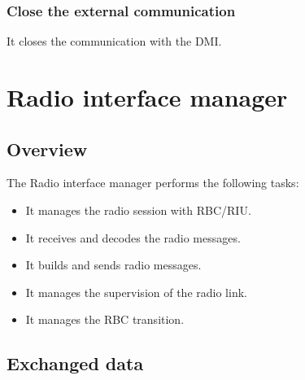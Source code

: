 \documentclass[nocc]{template/openetcs_report}
\begin{document}
\subsection{Close the external communication}
It closes the communication with the DMI.

\chapter{Radio interface manager}
\section{Overview}
The Radio interface manager performs the following tasks:
\begin{itemize}
\item	It manages the radio session with RBC/RIU.
\item	It receives and decodes the radio messages.
\item	It builds and sends radio messages.
\item	It manages the supervision of the radio link.
\item	It manages the RBC transition.
\end{itemize}
\section{Exchanged data}
\end{document}
